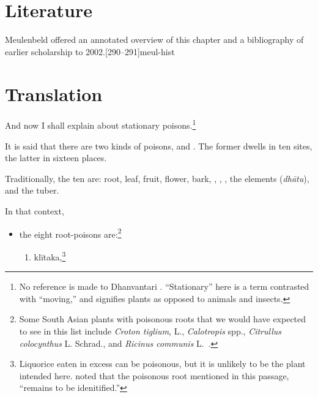 \section{Literature}

Meulenbeld offered an annotated overview of this chapter and a bibliography
of earlier scholarship to 2002.[290--291]{meul-hist} 

\section{Translation}

\begin{translation}
    
    \item[1]
    And now I shall explain  about stationary 
    poisons.\footnote{No reference is made to Dhanvantari 
    \citep[see][]{birc-2021}. “Stationary” here is a term contrasted with “moving,” 
    and signifies plants as opposed to animals and insects.}
  
    \item[3]
    \noindent It is said that there are two kinds of poisons,
     and . The former
    dwells in ten sites, the latter in sixteen places.
   
    \item[4]
    Traditionally, the ten are: root, leaf, fruit, flower, bark,
    , , , the
    elements (\emph{dhātu}), and the tuber.

    \item[5]
    
    In that context,\label{poisonousplants}
    \begin{itemize}
        \item the eight root-poisons are:\footnote{Some South Asian plants with
    poisonous roots that we would have expected to see in this list include
    \emph{Croton tiglium}, L., \emph{Calotropis} spp., \emph{Citrullus colocynthus} L. 
    Schrad., and \emph{Ricinus
    communis} L.\ \citep{pill-2010}.} 
        \begin{enumerate}
        \item  \gls{klītaka},\footnote{Liquorice eaten in excess can be poisonous, but it is 
        unlikely to be the plant intended here.  \citet[124]{gvdb} noted that the 
        poisonous 
        root mentioned in this passage, “remains to be idenitified.”}
       

\end{enumerate}
\end{itemize}
\end{translation}
